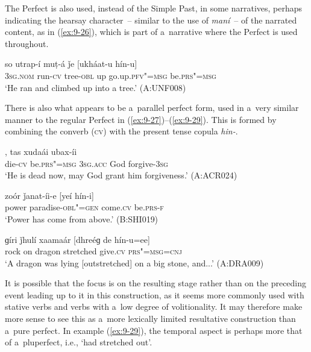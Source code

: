 The Perfect is also used, instead of the Simple Past, in some narratives, perhaps indicating the hearsay character~-- similar to the use of \textit{maní}~-- of the narrated content, as in (\ref{ex:9-26}), which is part of a~narrative where the Perfect is used throughout.

\begin{exe}
\ex
\label{ex:9-26}
\gll so utrap-í muṭ-á ǰe [ukháat-u hín-u] \\
\textsc{3sg.nom} run-\textsc{cv} tree-\textsc{obl} up go.up.\textsc{pfv"=msg} be.\textsc{prs"=msg} \\
\glt `He ran and climbed up into a tree.' (A:UNF008) 
\end{exe}

There is also what appears to be a~parallel perfect form, used in a~very similar manner to the regular Perfect in (\ref{ex:9-27})--(\ref{ex:9-29}). This is formed by combining the converb (\textsc{cv}) with the present tense copula \textit{hin-}.

\begin{exe}
\ex
\label{ex:9-27}
, tas xudaái ubax-íi \\
die-\textsc{cv} be.\textsc{prs"=msg} \textsc{3sg.acc} God forgive-\textsc{3sg} \\
\glt `He is dead now, may God grant him forgiveness.' (A:ACR024)

\ex
\label{ex:9-28}
\gll zoór ǰanat-íi-e [yeí hín-i] \\
power paradise-\textsc{obl"=gen} come.\textsc{cv} be.\textsc{prs-f} \\
\glt `Power has come from above.' (B:SHI019)

\ex
\label{ex:9-29}
\gll ɡíri ǰhulí xaamaár [dhreéɡ de hín-u=ee] \\
rock on dragon stretched give.\textsc{cv} \textsc{prs"=msg=cnj} \\
\glt `A dragon was lying [outstretched] on a big stone, and...' (A:DRA009)
\end{exe}

It is possible that the focus is on the resulting stage rather than on the preceding event leading up to it in this construction, as it seems more commonly used with stative verbs and verbs with a~low degree of volitionality. It may therefore make more sense to see this as a~more lexically limited resultative construction \citep[135]{dahl1985} than a~pure perfect. In example (\ref{ex:9-29}), the temporal aspect is perhaps more that of a~pluperfect, i.e., `had stretched out'. 



